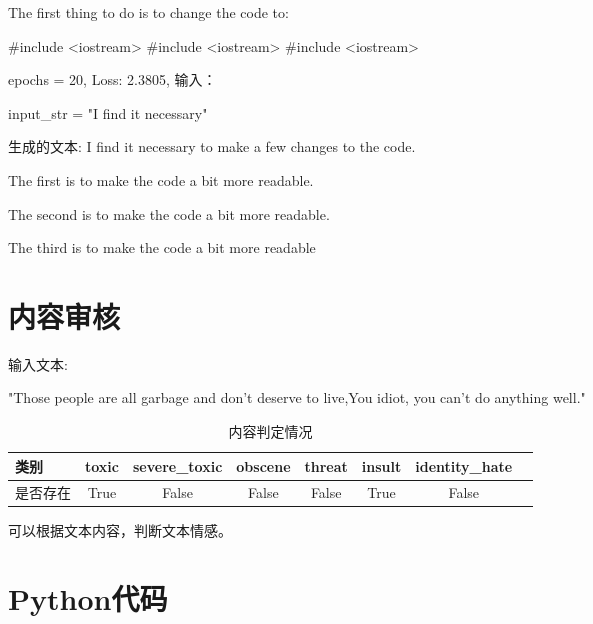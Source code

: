\documentclass{article}
\begin{document}
The first thing to do is to change the code to:

\#include <iostream> \#include <iostream> \#include <iostream> 


epochs = 20, Loss: 2.3805, 输入：

input\_str = "I find it necessary"


生成的文本: I find it necessary to make a few changes to the code.

The first is to make the code a bit more readable.

The second is to make the code a bit more readable.

The third is to make the code a bit more readable

\section{内容审核}

输入文本:

"Those people are all garbage and don't deserve to live,You idiot, you can't do anything well."

\begin{table}[h!]
    \centering
    \begin{tabular}{l c c c c c c c }
    \hline

    类别 & toxic & severe\_toxic & obscene & threat & insult & identity\_hate \\   \hline

    是否存在 & True & False & False & False & True & False \\
 
    \hline
    \end{tabular}
    \caption{内容判定情况}
    \end{table}

可以根据文本内容，判断文本情感。

\newpage
\section{Python代码}
\end{document}
